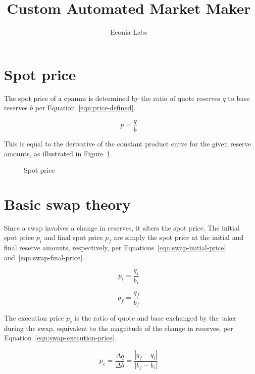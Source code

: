 \documentclass[table, twocolumn]{article}
\title{Custom Automated Market Maker}
\author{Econia Labs}
\date{}
\begin{document}

\maketitle

\section{Spot price}\label{sec:spot-price}

The spot price of a \gls*{cpamm} is determined by the ratio of quote reserves $q$ to
base reserves $b$ per Equation~\ref{eqn:price-defined}.

\begin{equation}\label{eqn:price-defined}
	p = \frac{q}{b}
\end{equation}

This is equal to the derivative of the constant product curve for the given reserve
amounts, as illustrated in Figure~\ref{fig:spot-price}.

\begin{figure}[!htb]
	\centering
	
	\caption{Spot price}\label{fig:spot-price}
\end{figure}

\section{Basic swap theory}\label{sec:basic-swap-theory}

Since a swap involves a change in reserves, it alters the spot price. The initial spot
price $p_i$ and final spot price $p_f$ are simply the spot price at the initial and
final reserve amounts, respectively, per Equations~\ref{eqn:swap-initial-price}
and~\ref{eqn:swap-final-price}.

\begin{equation}\label{eqn:swap-initial-price}
	p_i = \frac{q_i}{b_i}
\end{equation}

\begin{equation}\label{eqn:swap-final-price}
	p_f = \frac{q_f}{b_f}
\end{equation}

The execution price $p_e$ is the ratio of quote and base exchanged by the taker during
the swap, equivalent to the magnitude of the change in reserves, per
Equation~\ref{eqn:swap-execution-price}.

\begin{equation}\label{eqn:swap-execution-price}
	p_e = \frac{\Delta q}{\Delta b} = \frac{|q_f - q_i|}{|b_f - b_i|}
\end{equation}
\end{document}
